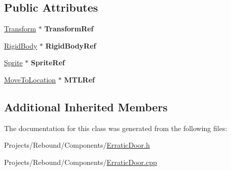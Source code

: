 \subsection*{Public Attributes}
\begin{DoxyCompactItemize}
\item 
\hypertarget{classDCEngine_1_1Components_1_1ErraticDoor_a459ef8a3e6a66d9afde290118f722b2d}{\hyperlink{classDCEngine_1_1Components_1_1Transform}{Transform} $\ast$ {\bfseries Transform\-Ref}}\label{classDCEngine_1_1Components_1_1ErraticDoor_a459ef8a3e6a66d9afde290118f722b2d}

\item 
\hypertarget{classDCEngine_1_1Components_1_1ErraticDoor_a99e218af1dfd6c9fcc7554fbaee5622f}{\hyperlink{classDCEngine_1_1Components_1_1RigidBody}{Rigid\-Body} $\ast$ {\bfseries Rigid\-Body\-Ref}}\label{classDCEngine_1_1Components_1_1ErraticDoor_a99e218af1dfd6c9fcc7554fbaee5622f}

\item 
\hypertarget{classDCEngine_1_1Components_1_1ErraticDoor_a6ff0d4a689dda2599a42214229419034}{\hyperlink{classDCEngine_1_1Components_1_1Sprite}{Sprite} $\ast$ {\bfseries Sprite\-Ref}}\label{classDCEngine_1_1Components_1_1ErraticDoor_a6ff0d4a689dda2599a42214229419034}

\item 
\hypertarget{classDCEngine_1_1Components_1_1ErraticDoor_aaa4dc57b29570b91bae7a0f2301d4b62}{\hyperlink{classDCEngine_1_1Components_1_1MoveToLocation}{Move\-To\-Location} $\ast$ {\bfseries M\-T\-L\-Ref}}\label{classDCEngine_1_1Components_1_1ErraticDoor_aaa4dc57b29570b91bae7a0f2301d4b62}

\end{DoxyCompactItemize}
\subsection*{Additional Inherited Members}


The documentation for this class was generated from the following files\-:\begin{DoxyCompactItemize}
\item 
Projects/\-Rebound/\-Components/\hyperlink{ErraticDoor_8h}{Erratic\-Door.\-h}\item 
Projects/\-Rebound/\-Components/\hyperlink{ErraticDoor_8cpp}{Erratic\-Door.\-cpp}\end{DoxyCompactItemize}
